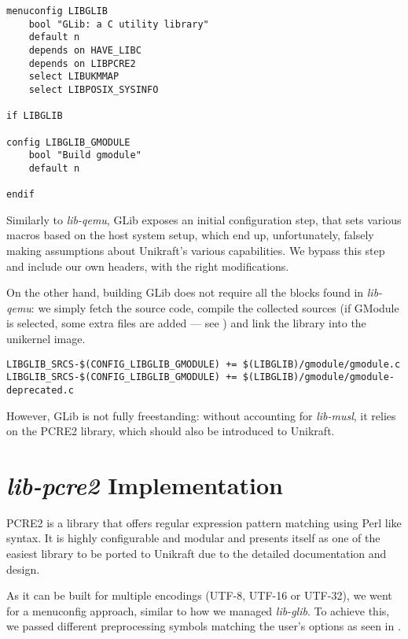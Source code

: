 \begin{lstlisting}
menuconfig LIBGLIB
    bool "GLib: a C utility library"
    default n
    depends on HAVE_LIBC
    depends on LIBPCRE2
    select LIBUKMMAP
    select LIBPOSIX_SYSINFO

if LIBGLIB

config LIBGLIB_GMODULE
    bool "Build gmodule"
    default n

endif
\end{lstlisting}

Similarly to \textit{lib-qemu}, GLib exposes an initial configuration step, that sets various macros based on the host system setup, which end up, unfortunately, falsely making assumptions about Unikraft's various capabilities.
We bypass this step and include our own headers, with the right modifications.

On the other hand, building GLib does not require all the blocks found in \textit{lib-qemu}: we simply fetch the source code, compile the collected sources (if GModule is selected, some extra files are added — see ) and link the library into the unikernel image.

\begin{lstlisting}
LIBGLIB_SRCS-$(CONFIG_LIBGLIB_GMODULE) += $(LIBGLIB)/gmodule/gmodule.c
LIBGLIB_SRCS-$(CONFIG_LIBGLIB_GMODULE) += $(LIBGLIB)/gmodule/gmodule-deprecated.c
\end{lstlisting}

However, GLib is not fully freestanding: without accounting for \textit{lib-musl}, it relies on the PCRE2 library, which should also be introduced to Unikraft.

\section{\textit{lib-pcre2} Implementation}
\label{impl-lib-pcre2}

PCRE2 \cite{pcre2} is a library that offers regular expression pattern matching using Perl like syntax.
It is highly configurable and modular and presents itself as one of the easiest library to be ported to Unikraft due to the detailed documentation and design.

As it can be built for multiple encodings (UTF-8, UTF-16 or UTF-32), we went for a menuconfig approach, similar to how we managed \textit{lib-glib}.
To achieve this, we passed different preprocessing symbols matching the user's options as seen in .


